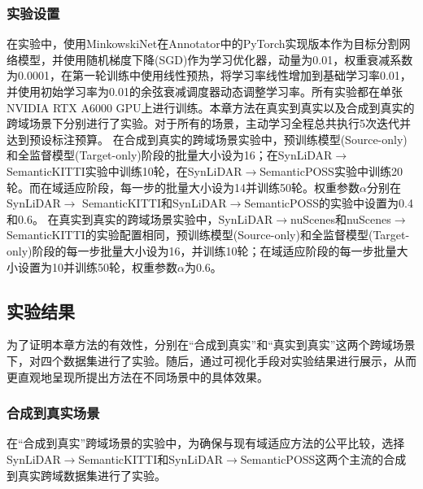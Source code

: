 \subsubsection{实验设置}
在实验中，使用MinkowskiNet在Annotator中的PyTorch实现版本作为目标分割网络模型，并使用随机梯度下降(SGD)作为学习优化器，动量为0.01，权重衰减系数为0.0001，在第一轮训练中使用线性预热，将学习率线性增加到基础学习率0.01，并使用初始学习率为0.01的余弦衰减调度器动态调整学习率。所有实验都在单张NVIDIA RTX A6000 GPU上进行训练。本章方法在真实到真实以及合成到真实的跨域场景下分别进行了实验。对于所有的场景，主动学习全程总共执行5次迭代并达到预设标注预算。
在合成到真实的跨域场景实验中，预训练模型(Source-only)和全监督模型(Target-only)阶段的批量大小设为16；在SynLiDAR$\to$SemanticKITTI实验中训练10轮，在SynLiDAR$\to$SemanticPOSS实验中训练20轮。而在域适应阶段，每一步的批量大小设为14并训练50轮。权重参数$\alpha$分别在SynLiDAR$\to$ SemanticKITTI和SynLiDAR$\to$SemanticPOSS的实验中设置为0.4和0.6。
在真实到真实的跨域场景实验中，SynLiDAR$\to$nuScenes和nuScenes$\to$SemanticKITTI的实验配置相同，预训练模型(Source-only)和全监督模型(Target-only)阶段的每一步批量大小设为16，并训练10轮；在域适应阶段的每一步批量大小设置为10并训练50轮，权重参数$\alpha$为0.6。
\subsection{实验结果}
为了证明本章方法的有效性，分别在“合成到真实”和“真实到真实”这两个跨域场景下，对四个数据集进行了实验。随后，通过可视化手段对实验结果进行展示，从而更直观地呈现所提出方法在不同场景中的具体效果。
\subsubsection{合成到真实场景}
在“合成到真实”跨域场景的实验中，为确保与现有域适应方法的公平比较，选择SynLiDAR\(\to\)SemanticKITTI和SynLiDAR\(\to\)SemanticPOSS这两个主流的合成到真实跨域数据集进行了实验。
\vspace{0.1cm}


